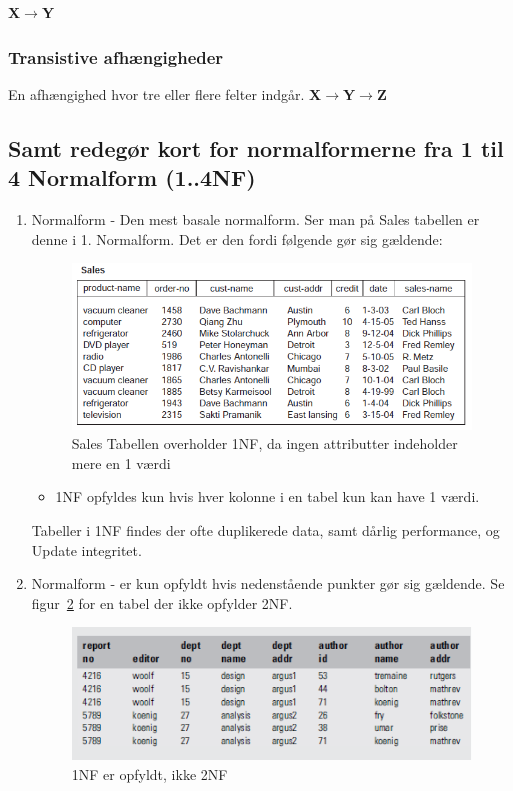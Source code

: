 \textbf{X$\rightarrow$Y}
\subsubsection{Transistive afhængigheder}
En afhængighed hvor tre eller flere felter indgår.
\textbf{X$\rightarrow$Y$\rightarrow$Z}


\subsection{Samt redegør kort for normalformerne fra 1 til 4 Normalform (1..4NF)}

\begin{enumerate}
	\item Normalform - Den mest basale normalform. Ser man på Sales tabellen er denne i 1. Normalform. Det er den fordi følgende gør sig gældende:
		\begin{figure}[H]
			\centering
			\includegraphics[width=0.7\linewidth]{figs/spm5/notNormalizedTable.PNG}
			\caption{Sales Tabellen overholder 1NF, da ingen attributter indeholder mere en 1 værdi}
			\label{fig:notNormalizedTable}
		\end{figure}
	\begin{itemize}
		\item 1NF opfyldes kun hvis hver kolonne i en tabel kun kan have 1 værdi.
	\end{itemize}
	Tabeller i 1NF findes der ofte duplikerede data, samt dårlig performance, og Update integritet.
	
	\item Normalform - er kun opfyldt hvis nedenstående punkter gør sig gældende. Se figur~\ref{fig:not2NF} for en tabel der ikke opfylder 2NF.
	
	\begin{figure}[H]
		\centering
		\includegraphics[width=0.7\linewidth]{figs/spm5/not2NF.PNG}
		\caption{1NF er opfyldt, ikke 2NF}
		\label{fig:not2NF}
	\end{figure}
	

\end{enumerate}
